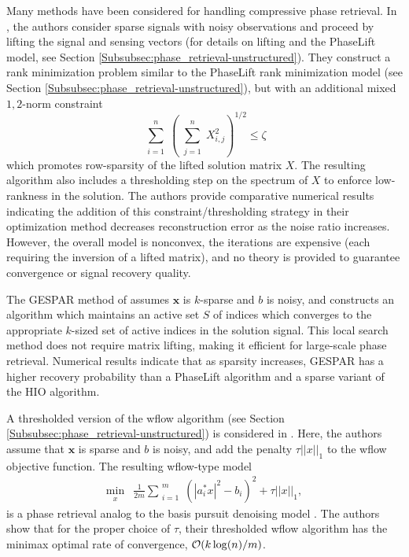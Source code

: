 Many methods have been considered for handling compressive phase retrieval.  
In \cite{DBLP:journals/corr/abs-1104-4406}, the authors consider sparse signals with noisy observations and proceed by lifting the signal and sensing vectors (for details on lifting and the PhaseLift model, see Section \ref{Subsubsec:phase_retrieval-unstructured}).  
They construct a rank minimization problem similar to the PhaseLift rank minimization model (see Section \ref{Subsubsec:phase_retrieval-unstructured}), but with an additional mixed $1,2$-norm constraint
\[
	\sum\limits_{\substack{i = 1}}^{\substack{n}}
	\left( 	\sum\limits_{\substack{j = 1}}^{\substack{n}}  X_{i, j}^2
	\right)^{1/2}
	\leq \zeta
\]
which promotes row-sparsity of the lifted solution matrix $X$.  The resulting algorithm also includes a thresholding step on the spectrum of $X$ to enforce low-rankness in the solution.   
The authors provide comparative numerical results indicating the addition of this constraint/thresholding strategy in their optimization method decreases reconstruction error as the noise ratio increases.  
However, the overall model is nonconvex, the iterations are expensive (each requiring the inversion of a lifted matrix), and no theory is provided to guarantee convergence or signal recovery quality.


The GESPAR method of \cite{shechtman2014gespar} assumes $\mathbf{x}$ is $k$-sparse and $b$ is noisy, and constructs an algorithm which maintains an active set $S$ of indices which converges to the appropriate $k$-sized set of active indices in the solution signal.  
This local search method does not require matrix lifting, making it efficient for large-scale phase retrieval.  
Numerical results \cite[Section 5]{shechtman2014gespar} indicate that as sparsity increases, GESPAR has a higher recovery probability than a PhaseLift algorithm and a sparse variant of the HIO algorithm.



A thresholded version of the wflow algorithm (see Section \ref{Subsubsec:phase_retrieval-unstructured}) is considered in \cite{cai2016optimal}.
Here, the authors assume that $\mathbf{x}$ is sparse and $b$ is noisy, and add the penalty $\tau ||x||_1$ to the wflow objective function.
The resulting wflow-type model
\begin{equation}
\begin{array}{ll}
	\min\limits_{\substack{x}}
		&	\frac{1}{2m} \sum\limits_{\substack{i=1}}^{\substack{m}} \left( |a_i^*x|^2 - b_i \right)^2
			+ \tau ||x||_1,
\end{array}
\end{equation}
is a phase retrieval analog to the basis pursuit denoising model \cite{chen2001atomic}.
The authors show that for the proper choice of $\tau$, their thresholded wflow algorithm has the minimax optimal rate of convergence, ${\mathcal O} (k \log(n) / m)$.


